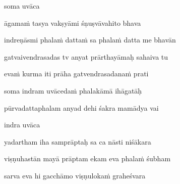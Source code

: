 soma uvāca~{\dandab}\dontdisplaylinenum 

āgamaṁ tasya vakṣyāmi śṇuṣvāvahito bhava\thinspace{\danda} \dontdisplaylinenum
{}

indreṇāsmi phalaṁ dattaṁ sa phalaṁ datta me bhavān \veg\dontdisplaylinenum

gatvaivendrasadas tv anyat prārthayāmaḥ sahaiva tu\thinspace{\dandab} \dontdisplaylinenum
{}

evaṁ kurma iti prāha gatvendrasadanaṁ prati \veg\dontdisplaylinenum
{}

soma indram uvācedaṁ phalakāmā ihāgatāḥ\thinspace{\dandab} \dontdisplaylinenum
{}

pūrvadattaphalam anyad dehi śakra mamādya vai \veg\dontdisplaylinenum
{}

indra uvāca~{\dandab}\dontdisplaylinenum 

yadartham iha samprāptaḥ sa ca nāsti niśākara\thinspace{\danda} \dontdisplaylinenum
{}

viṣṇuhastān mayā prāptam ekam eva phalaṁ śubham \veg\dontdisplaylinenum
{}

sarva eva hi gacchāmo viṣṇulokaṁ graheśvara\thinspace{\dandab} \dontdisplaylinenum
{}

